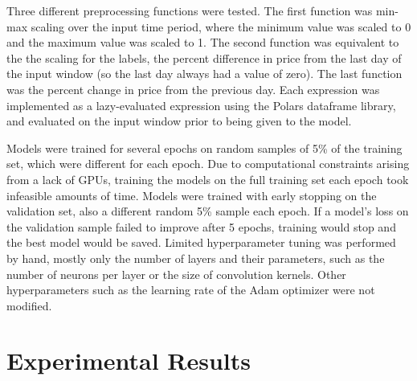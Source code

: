 \documentclass[conference]{IEEEtran}
\begin{document}
Three different preprocessing functions were tested. The first function was min-max scaling over the input time period, where the minimum value was scaled to 0 and the maximum value was scaled to 1. The second function was equivalent to the the scaling for the labels, the percent difference in price from the last day of the input window (so the last day always had a value of zero). The last function was the percent change in price from the previous day. Each expression was implemented as a lazy-evaluated expression using the Polars dataframe library, and evaluated on the input window prior to being given to the model.

Models were trained for several epochs on random samples of 5\% of the training set, which were different for each epoch. Due to computational constraints arising from a lack of GPUs, training the models on the full training set each epoch took infeasible amounts of time. Models were trained with early stopping on the validation set, also a different random 5\% sample each epoch. If a model's loss on the validation sample failed to improve after 5 epochs, training would stop and the best model would be saved. Limited hyperparameter tuning was performed by hand, mostly only the number of layers and their parameters, such as the number of neurons per layer or the size of convolution kernels. Other hyperparameters such as the learning rate of the Adam optimizer were not modified.

\section{Experimental Results}
\end{document}
